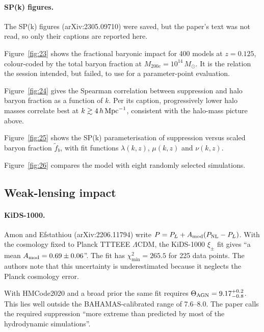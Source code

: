 \documentclass[11pt,a4paper]{article}
\begin{document}
\paragraph{SP(k) figures.} The SP(k) figures (arXiv:2305.09710) were saved, but the paper's text was not read, so only their captions are reported here.






Figure~\ref{fig:23} shows the fractional baryonic impact for 400 models at $z=0.125$, colour-coded by the total baryon fraction at $M_{200c}=10^{14}\,M_\odot$. It is the relation the session intended, but failed, to use for a parameter-point evaluation.






Figure~\ref{fig:24} gives the Spearman correlation between suppression and halo baryon fraction as a function of $k$. Per its caption, progressively lower halo masses correlate best at $k\gtrsim4\,h\,{\rm Mpc}^{-1}$, consistent with the halo-mass picture above.






Figure~\ref{fig:25} shows the SP(k) parameterisation of suppression versus scaled baryon fraction $\tilde f_b$, with fit functions $\lambda(k,z)$, $\mu(k,z)$ and $\nu(k,z)$.






Figure~\ref{fig:26} compares the model with eight randomly selected simulations.

\subsection{Weak-lensing impact}
\paragraph{KiDS-1000.} Amon and Efstathiou (arXiv:2206.11794) write $P=P_L+A_{\rm mod}(P_{\rm NL}-P_L)$. With the cosmology fixed to Planck TTTEEE $\Lambda$CDM, the KiDS-1000 $\xi_\pm$ fit gives ``a mean $A_{\rm mod} = 0.69 \pm 0.06$''. The fit has $\chi^2_{\min}=265.5$ for 225 data points. The authors note that this uncertainty is underestimated because it neglects the Planck cosmology error.

With HMCode2020 and a broad prior the same fit requires $\Theta_{\rm AGN}=9.17^{+0.2}_{-0.8}$. This lies well outside the BAHAMAS-calibrated range of 7.6--8.0. The paper calls the required suppression ``more extreme than predicted by most of the hydrodynamic simulations''.
\end{document}
